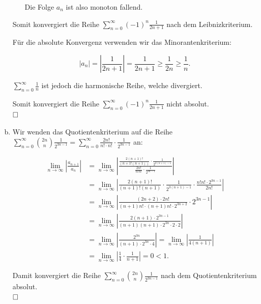 \documentclass[12pt,a4paper]{article}
\newcommand{\qed}{\null\nobreak\hfill\square}
\newcommand{\textqed}{\\$\qed$}
\begin{document}
\begin{enumerate}[(a)]
\begin{itemize}
        Die Folge $a_n$ ist also monoton fallend.
    \end{itemize}

    Somit konvergiert die Reihe $\sum\limits_{n=0}^{\infty} (-1)^n \frac{1}{2n+1}$ nach dem Leibnizkriterium.

    Für die absolute Konvergenz verwenden wir das Minorantenkriterium:

    $$\left|a_n\right| = \left|\frac{1}{2n+1}\right| = \frac{1}{2n+1} \geq \frac{1}{2n} \geq \frac{1}{n}.$$

    $\sum\limits_{n=0}^{\infty} \frac{1}{n}$ ist jedoch die harmonische Reihe, welche divergiert.

    Somit konvergiert die Reihe $\sum\limits_{n=0}^{\infty} (-1)^n \frac{1}{2n+1}$ nicht absolut. \textqed

    \item Wir wenden das Quotientenkriterium auf die Reihe\\
    $\sum\limits_{n=0}^{\infty} \binom{2n}{n} \frac{1}{2^{3n-1}} = \sum\limits_{n=0}^{\infty} \frac{2n!}{n! \cdot n!} \cdot \frac{1}{2^{3n-1}}$ an:

    \begin{align*}
        \lim\limits_{n \to \infty} \left|\frac{a_{n+1}}{a_n}\right|
        &= \lim\limits_{n \to \infty} \left|\frac{\frac{2(n+1)!}{(n+1!(n+1))} \cdot \frac{1}{2^{3(n+1)-1}}}{\frac{2n!}{n!n!} \cdot \frac{1}{2^{3n-1}}}\right|\\
        &= \lim\limits_{n \to \infty} \left|\frac{2(n+1)!}{(n+1)!(n+1)} \cdot \frac{1}{2^{3(n+1)-1}} \cdot \frac{n!n! \cdot 2^{3n-1}}{2n!}\right|\\
        &= \lim\limits_{n \to \infty} \left|\frac{(2n+2) \cdot 2n!}{(n+1)n! \cdot (n+1)n! \cdot 2^{3n+2}} \cdot 2^{3n-1}\right|\\
        &= \lim\limits_{n \to \infty} \left|\frac{2(n+1) \cdot 2^{3n-1}}{(n+1)(n+1) \cdot 2^{3n} \cdot 2 \cdot 2}\right|\\
        &= \lim\limits_{n \to \infty} \left|\frac{2^{3n}}{(n+1) \cdot 2^{3n} \cdot 4}\right|
        = \lim\limits_{n \to \infty} \left|\frac{1}{4(n+1)}\right|\\
        &= \lim\limits_{n \to \infty} \left|\frac{1}{4} \cdot \frac{1}{n+1}\right|
        = 0 < 1.
    \end{align*}

    Damit konvergiert die Reihe $\sum\limits_{n=0}^{\infty} \binom{2n}{n} \frac{1}{2^{3n-1}}$ nach dem Quotientenkriterium absolut. \textqed
\end{enumerate}
\end{document}
